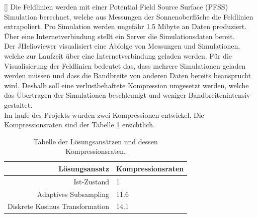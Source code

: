 [\baselineskip]
Die Feldlinien werden mit einer Potential Field Source Surface (PFSS) Simulation berechnet, welche aus Messungen der Sonnenoberfläche die Feldlinien extrapoliert. Pro Simulation werden ungefähr 1.5 Mibyte an Daten produziert. Über eine Internetverbindung stellt ein Server die Simulationsdaten bereit.\\
Der JHelioviewer visualisiert eine Abfolge von Messungen und Simulationen, welche zur Laufzeit über eine Internetverbindung geladen werden. Für die Visualisierung der Feldlinien bedeutet das, dass mehrere Simulationen geladen werden müssen und dass die Bandbreite von anderen Daten bereits beansprucht wird. Deshalb soll eine verlustbehaftete Kompression umgesetzt werden, welche das Übertragen der Simulationen beschleunigt und weniger Bandbreitenintensiv gestaltet.\\
[\baselineskip]
Im laufe des Projekts wurden zwei Kompressionen entwickel. Die Kompressionsraten sind der Tabelle \ref{einleitung:tabelle} ersichtlich.
\begin{table}[!htbp]
	\center
	\begin{tabular}{r|l}
		Lösungsansatz & Kompressionsraten \\\hline
		Ist-Zustand & 1\\
		Adaptives Subsampling & 11.6 \\
		Diskrete Kosinus Transformation & 14.1 \\
	\end{tabular}
	\caption{Tabelle der Lösungsansätzen und dessen Kompressionsraten.}
	\label{einleitung:tabelle}
\end{table}
